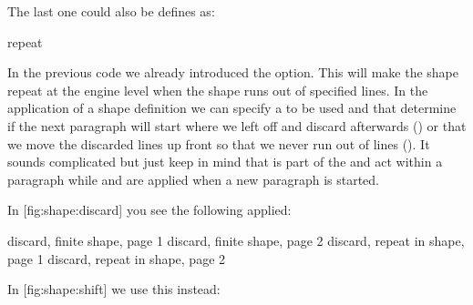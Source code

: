 
The last one could also be defines as:

\starttyping[option=TEX]
     repeat
\stopparagraphshape
\stoptyping

In the previous code we already introduced the  option. This will
make the shape repeat at the engine level when the shape runs out of specified
lines. In the application of a shape definition we can specify a 
to be used and that determine if the next paragraph will start where we left off
and discard afterwards () or that we move the discarded lines up
front so that we never run out of lines (). It sounds complicated
but just keep in mind that  is part of the \type {\parshape} and
act within a paragraph while  and  are applied when a
new paragraph is started.

\startbuffer[demo]
\startshapedparagraph[list=test]
\stopshapedparagraph
\stopbuffer

\startshapedparagraph[list=test-repeat]
\stopshapedparagraph
\stopbuffer

In  [fig:shape:discard] you see the following applied:


\startplacefigure[title=Discarded shaping,reference=fig:shape:discard]
               {discard, finite shape,    page 1}
    {}               {discard, finite shape,    page 2}
    {} {discard, repeat in shape, page 1}
    {} {discard, repeat in shape, page 2}
\stopcombination
\stopplacefigure

In  [fig:shape:shift] we use this instead:

\startbuffer[demo]
\startshapedparagraph[list=test,method=shift]
\stopshapedparagraph
\stopbuffer

